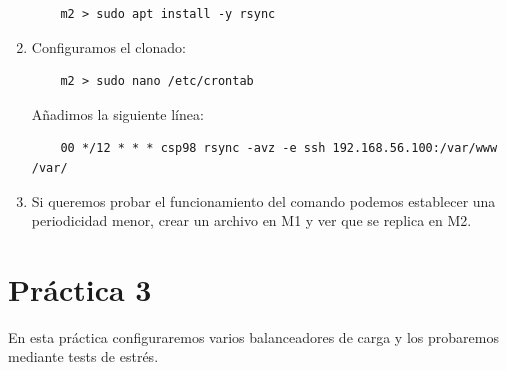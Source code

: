 \documentclass[12pt,spanish]{article}
\begin{document}
\begin{enumerate}
	\begin{lstlisting}
	m2 > sudo apt install -y rsync
	\end{lstlisting}
	\item Configuramos el clonado:
	\begin{lstlisting}
	m2 > sudo nano /etc/crontab
	\end{lstlisting}
	Añadimos la siguiente línea:
	\begin{lstlisting}
	00 */12 * * * csp98 rsync -avz -e ssh 192.168.56.100:/var/www /var/
	\end{lstlisting}
	\item Si queremos probar el funcionamiento del comando podemos establecer una periodicidad menor, crear un archivo en M1 y ver que se replica en M2.
\end{enumerate}
\newpage
\section{Práctica 3}
En esta práctica configuraremos varios balanceadores de carga y los probaremos mediante tests de estrés.
\end{document}
